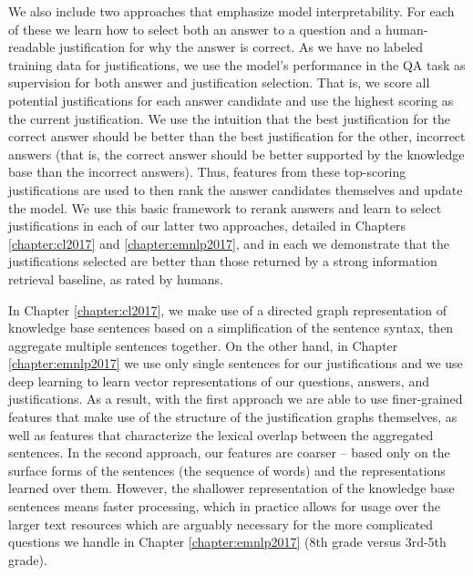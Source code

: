 We also include two approaches that emphasize model interpretability.  For each of these we learn how to select both an answer to a question and a human-readable justification for why the answer is correct.  As we have no labeled training data for justifications, we use the model's performance in the QA task as supervision for both answer and justification selection.  That is, we score all potential justifications for each answer candidate and use the highest scoring as the current justification.  We use the intuition that the best justification for the correct answer should be better than the best justification for the other, incorrect answers (that is, the correct answer should be better supported by the knowledge base than the incorrect answers).  Thus, features from these top-scoring justifications are used to then rank the answer candidates themselves and update the model.  We use this basic framework to rerank answers and learn to select justifications in each of our latter two approaches, detailed in Chapters \ref{chapter:cl2017} and \ref{chapter:emnlp2017}, and in each we demonstrate that the justifications selected are better than those returned by a strong information retrieval baseline, as rated by humans. 
 
In Chapter \ref{chapter:cl2017}, we make use of a directed graph representation of knowledge base sentences based on a simplification of the sentence syntax, then aggregate multiple sentences together.  On the other hand, in Chapter \ref{chapter:emnlp2017} we use only single sentences for our justifications and we use deep learning to learn vector representations of our questions, answers, and justifications.  As a result, with the first approach we are able to use finer-grained features that make use of the structure of the justification graphs themselves, as well as features that characterize the lexical overlap between the aggregated sentences.   In the second approach, our features are coarser -- based only on the surface forms of the sentences (the sequence of words) and the representations learned over them.  However, the shallower representation of the knowledge base sentences means faster processing, which in practice allows for usage over the larger text resources which are arguably necessary for the more complicated questions we handle in Chapter \ref{chapter:emnlp2017} (8th grade versus 3rd-5th grade).        



